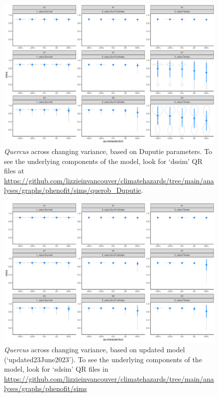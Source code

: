 \documentclass[11pt,letter]{article}
\begin{document}
\begin{figure}[h!]
 \begin{center}
\noindent \includegraphics[width=1\textwidth]{..//analyses/graphs/phenofit/sims/querob_Duputie/sdsim_3metricsQR.pdf}
  \caption{\emph{Quercus} across changing variance, based on Duputie parameters. To see the underlying components of the model, look for `dssim' QR files at \url{https://github.com/lizzieinvancouver/climatehazards/tree/main/analyses/graphs/phenofit/sims/querob_Duputie}.}
  \label{fig:simssdDup}
  \end{center}
\end{figure}

\begin{figure}[h!]
 \begin{center}
\noindent \includegraphics[width=1\textwidth]{..//analyses/graphs/phenofit/sims/metrics3/sdsim_3metricsQR.pdf}
  \caption{\emph{Quercus} across changing variance, based on updated model (`updated23June2023'). To see the underlying components of the model, look for `sdsim' QR files in \url{https://github.com/lizzieinvancouver/climatehazards/tree/main/analyses/graphs/phenofit/sims}}
  \label{fig:simssdUp}
  \end{center}
\end{figure}
\end{document}
